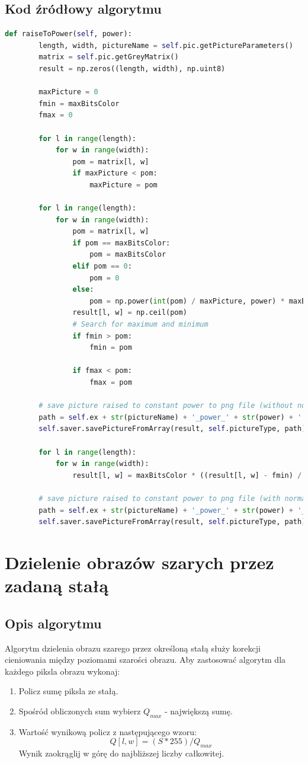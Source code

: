 \documentclass[a4paper,12pt, titlepage]{report}
\begin{document}
\subsection*{Kod źródłowy algorytmu}
\begin{lstlisting}[language=Python]
def raiseToPower(self, power):
        length, width, pictureName = self.pic.getPictureParameters()
        matrix = self.pic.getGreyMatrix()
        result = np.zeros((length, width), np.uint8)

        maxPicture = 0
        fmin = maxBitsColor
        fmax = 0

        for l in range(length):
            for w in range(width):
                pom = matrix[l, w]
                if maxPicture < pom:
                    maxPicture = pom

        for l in range(length):
            for w in range(width):
                pom = matrix[l, w]
                if pom == maxBitsColor:
                    pom = maxBitsColor
                elif pom == 0:
                    pom = 0
                else:
                    pom = np.power(int(pom) / maxPicture, power) * maxBitsColor
                result[l, w] = np.ceil(pom)
                # Search for maximum and minimum
                if fmin > pom:
                    fmin = pom

                if fmax < pom:
                    fmax = pom

        # save picture raised to constant power to png file (without normalization)
        path = self.ex + str(pictureName) + '_power_' + str(power) + '.png'
        self.saver.savePictureFromArray(result, self.pictureType, path)

        for l in range(length):
            for w in range(width):
                result[l, w] = maxBitsColor * ((result[l, w] - fmin) / (fmax - fmin))

        # save picture raised to constant power to png file (with normalization)
        path = self.ex + str(pictureName) + '_power_' + str(power) + '_normalized.png'
        self.saver.savePictureFromArray(result, self.pictureType, path)
\end{lstlisting}

\section{Dzielenie obrazów szarych przez zadaną stałą}
\subsection*{Opis algorytmu}
\par Algorytm dzielenia obrazu szarego przez określoną stałą służy korekcji cieniowania między poziomami szarości obrazu. Aby zastosować algorytm dla każdego piksla obrazu wykonaj:
\begin{enumerate}
\item Policz sumę piksla ze stałą.
\item Spośród obliczonych sum wybierz \(Q_{max}\) - największą sumę.
\item Wartość wynikową policz z następującego wzoru: \[Q[l,w]=(S*255)/Q_{max}\]Wynik zaokrąglij w górę do najbliższej liczby całkowitej.
\end{enumerate}
\end{document}
